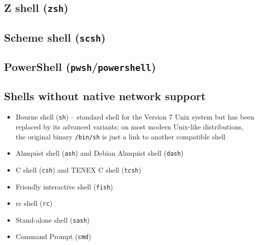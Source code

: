 \subsection{Z shell (\texttt{zsh})}




\subsection{Scheme shell (\texttt{scsh})}


\subsection{PowerShell (\texttt{pwsh}/\texttt{powershell})}




\subsection{Shells without native network support}


\begin{itemize}
\item Bourne shell (\texttt{sh}) -- standard shell for the Version 7 Unix system but has been replaced by its advanced variants; on most modern Unix-like distributions, the original binary \texttt{/bin/sh} is just a link to another compatible shell
\item Almquist shell (\texttt{ash}) and Debian Almquist shell (\texttt{dash})
\item C shell (\texttt{csh}) and TENEX C shell (\texttt{tcsh})
\item Friendly interactive shell (\texttt{fish})
\item rc shell (\texttt{rc})
\item Stand-alone shell (\texttt{sash})
\item Command Prompt (\texttt{cmd})
\end{itemize}


